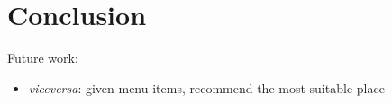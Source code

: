 \section{Conclusion} \label{sec:conclusions}

Future work:
\begin{itemize}
\item \textit{viceversa}: given menu items, recommend the most suitable place
\end{itemize}